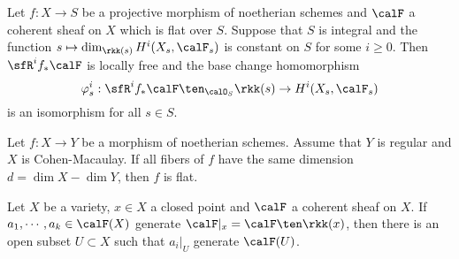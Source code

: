     \begin{theorem}\label{thm:Grauert_theorem}
        Let \(f:X \to S\) be a projective morphism of noetherian schemes and \(\calF\) a coherent sheaf on \(X\) which is flat over \(S\).
        Suppose that \(S\) is integral and the function \(s \mapsto \dim_{\rkk(s)} H^i(X_s,\calF_s)\) is constant on \(S\) for some \(i \geq 0\). 
        Then \(\sfR^i f_*\calF\) is locally free and the base change homomorphism
        \[
            \varphi_s^i: \sfR^i f_*\calF \ten_{\calO_S} \rkk(s) \to H^i(X_s,\calF_s)
        \]
        is an isomorphism for all \(s \in S\).
    \end{theorem}

    \begin{theorem}\label{thm:miracle_flatness}
        Let \(f:X \to Y\) be a morphism of noetherian schemes. 
        Assume that \(Y\) is regular and \(X\) is Cohen-Macaulay. 
        If all fibers of \(f\) have the same dimension \(d = \dim X - \dim Y\), then \(f\) is flat.
    \end{theorem}

    \begin{proposition}\label{prop: geometric form of Nakayama's lemma}
        Let \(X\) be a variety, $x\in X$ a closed point and $\calF$ a coherent sheaf on $X$.
        If $a_1,\cdots,a_k \in \calF(X)$ generate $\calF|_x = \calF \ten \rkk(x)$, then there is an open subset $U \subset X$ such that $a_i|_U$ generate $\calF(U)$. 
    \end{proposition}

